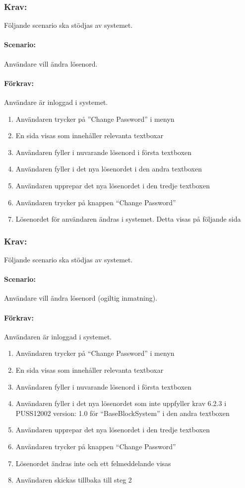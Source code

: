 \documentclass[paper=a4, fontsize=11pt,twoside]{article}
\begin{document}
\subsubsection{Krav:} Följande scenario ska stödjas av systemet.
\paragraph{Scenario:}Användare vill ändra lösenord.
\paragraph{Förkrav:}
Användare är inloggad i systemet.
\begin{enumerate}
\item	Användaren trycker på ”Change Password” i menyn
\item	En sida visas som innehåller relevanta textboxar
\item	Användaren fyller i nuvarande lösenord i första textboxen
\item	Användaren fyller i det nya lösenordet i den andra textboxen
\item	Användaren upprepar det nya lösenordet i den tredje textboxen
\item	Användaren trycker på knappen “Change Password”
\item	Lösenordet för användaren ändras i systemet. Detta visas på följande sida
\end{enumerate}

\subsubsection{Krav:}Följande scenario ska stödjas av systemet.
\paragraph{Scenario:}Användare vill ändra lösenord (ogiltig inmatning).
\paragraph{Förkrav:}
Användaren är inloggad i systemet.
\begin{enumerate}
\item  Användaren trycker på “Change Password” i menyn
\item	 En sida visas som innehåller relevanta textboxar
\item	Användaren fyller i nuvarande lösenord i första textboxen
\item	Användaren fyller i det nya lösenordet som inte uppfyller krav 6.2.3 i PUSS12002 version: 1.0 för “BaseBlockSystem” i den andra textboxen
\item	Användaren upprepar det nya lösenordet i den tredje textboxen
\item	Användaren trycker på knappen “Change Password”
\item	Lösenordet ändras inte och ett felmeddelande visas
\item Användaren skickas tillbaka till steg 2
\end{enumerate}
\end{document}
